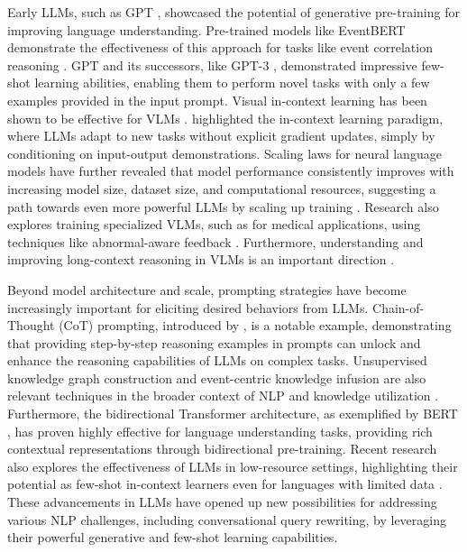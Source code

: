 Early LLMs, such as GPT \cite{GPT2018}, showcased the potential of generative pre-training for improving language understanding.  Pre-trained models like EventBERT demonstrate the effectiveness of this approach for tasks like event correlation reasoning \cite{zhou2022eventbert}. GPT and its successors, like GPT-3 \cite{GPT3FewShot2020}, demonstrated impressive few-shot learning abilities, enabling them to perform novel tasks with only a few examples provided in the input prompt.  Visual in-context learning has been shown to be effective for VLMs \cite{zhou2024visual}.  \cite{GPT3FewShot2020} highlighted the in-context learning paradigm, where LLMs adapt to new tasks without explicit gradient updates, simply by conditioning on input-output demonstrations.  Scaling laws for neural language models have further revealed that model performance consistently improves with increasing model size, dataset size, and computational resources, suggesting a path towards even more powerful LLMs by scaling up training \cite{ScalingLawsNLM2020}.  Research also explores training specialized VLMs, such as for medical applications, using techniques like abnormal-aware feedback \cite{zhou2025training}. Furthermore, understanding and improving long-context reasoning in VLMs is an important direction \cite{zhou2024rethinking}.

Beyond model architecture and scale, prompting strategies have become increasingly important for eliciting desired behaviors from LLMs. Chain-of-Thought (CoT) prompting, introduced by \cite{CoTPrompting2022}, is a notable example, demonstrating that providing step-by-step reasoning examples in prompts can unlock and enhance the reasoning capabilities of LLMs on complex tasks.  Unsupervised knowledge graph construction and event-centric knowledge infusion are also relevant techniques in the broader context of NLP and knowledge utilization \cite{wang2022unsupervised}. Furthermore, the bidirectional Transformer architecture, as exemplified by BERT \cite{BERT2019}, has proven highly effective for language understanding tasks, providing rich contextual representations through bidirectional pre-training. Recent research also explores the effectiveness of LLMs in low-resource settings, highlighting their potential as few-shot in-context learners even for languages with limited data \cite{LLMsFewShotLearners2024}. These advancements in LLMs have opened up new possibilities for addressing various NLP challenges, including conversational query rewriting, by leveraging their powerful generative and few-shot learning capabilities.